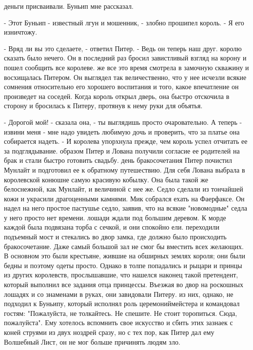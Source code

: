 деньги присваивали. Буньип мне рассказал.
\par- Этот Буньип - известный лгун и мошенник, - злобно прошипел 
король. - Я его изничтожу.
\par- Вряд ли вы это сделаете, - ответил Питер. - Ведь он теперь наш 
друг.
 королю сказать было нечего. Он в последний раз бросил 
завистливый взгляд на корону и пошел сообщить все королеве.
 же все это время смотрела в замочную скважину и восхищалась 
Питером. Он выглядел так величественно, что у нее исчезли всякие 
сомнения относительно его хорошего воспитания и того, какое 
впечатление он произведет на соседей. Когда король открыл дверь, она 
быстро отскочила в сторону и бросилась к Питеру, протянув к нему руки 
для объятья.
\par- Дорогой мой! - сказала она, - ты выглядишь просто очаровательно. 
А теперь - извини меня - мне надо увидеть любимую дочь и проверить, 
что за платье она собирается надеть. - И королева упорхнула прежде, 
чем король успел отчитать ее за подглядывание.
 образом Питер и Лована получили согласие ее родителей на 
брак и стали быстро готовить свадьбу.
 день бракосочетания Питер почистил Мунлайт и подготовил ее к 
обратному путешествию. Для себя Лована выбрала в королевской конюшне 
самую красивую кобылку. Она была такой же белоснежной, как Мунлайт, и 
величиной с нее же. Седло сделали из тончайшей кожи и украсили 
драгоценными камнями.
 Мик собрался ехать на Фаерфаксе. Он надел на него простое 
пастушье седло, заявив, что на всякие "новомодные" седла у него просто 
нет времени.
 лошади ждали под большим деревом. К морде каждой была 
подвязана торба с сечкой, и они спокойно ели.
 переходили подъемный мост и стекались во двор замка, где 
должно было происходить бракосочетание. Даже самый большой зал не смог 
бы вместить всех желающих. В основном это были крестьяне, жившие на 
обширных землях короля; они были бедны и поэтому одеты просто. Однако 
в толпе попадались и рыцари и принцы из других королевств, 
прослышавшие, что нашелся наконец такой претендент, который выполнил 
все задания отца принцессы. Въезжая во двор на роскошных лошадях и со 
знаменами в руках, они завидовали Питеру.
 из них, однако, не подходил к Буньипу, который исполнял роль 
церемониймейстера и командовал гостям: "Пожалуйста, не толкайтесь. Не 
спешите. Не стоит торопиться. Сюда, пожалуйста". Ему хотелось 
вспомнить свое искусство и сбить этих зазнаек с коней струями из двух 
ноздрей сразу, но с тех пор, как Питер дал ему Волшебный Лист, он не 
мог больше причинять людям зло.
